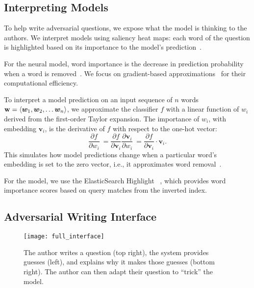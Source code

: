 \subsection{Interpreting \qb{} Models}

To help write adversarial questions, we expose
what the model is thinking to the authors.
We interpret models using saliency heat maps: each word of the
question is highlighted based on its importance to the model's
prediction~\cite{ribeiro2016should}.

For the neural model, word importance is the decrease in
prediction probability when a word is
removed~\cite{li2016understanding,wallace2018Neighbors}.
We focus on gradient-based
approximations~\cite{simonyan2013saliency,montavon2017interpreting}
for their computational efficiency.

\setlength{\abovedisplayskip}{10pt}
\setlength{\belowdisplayskip}{10pt}
To interpret a model prediction on an input sequence of $n$
words~$\boldsymbol{\mathbf{w}}=\langle\bm{w}_1, \bm{w}_2, \ldots
\bm{w}_n\rangle$, we approximate the classifier $f$ with a linear
function of $w_i$ derived from the first-order Taylor expansion. The
importance of $w_i$, with embedding $\bm{v}_i$, is the derivative
of $f$ with respect to the one-hot vector: 
\begin{equation} \frac{\partial f}{\partial w_i} \
   = \frac{\partial f}{\partial \bm{v}_i}\frac{\partial \bm{v}_i}{\partial w_i} \ 
   = \frac{\partial f}{\partial \bm{v}_i} \cdot \bm{v}_i. 
\end{equation} 
This simulates how model predictions change when a particular word's embedding is set to the zero vector, i.e., it approximates word removal~\cite{ebrahimi2017hotflip,wallace2018Neighbors}.

For the \abr{ir} model, we use the ElasticSearch Highlight
~\cite{gormley2015elasticsearch}, which provides word
importance scores based on query matches from the inverted index.

\subsection{Adversarial Writing Interface}

\begin{figure*}[t]
\centering
\texttt{[image: full\_interface]}
\caption{The author writes a question (top right), the  system provides
  guesses (left), and explains why it makes those guesses (bottom
  right). The author can then adapt their question to ``trick'' the
  model.}
\label{interface}
\end{figure*}

